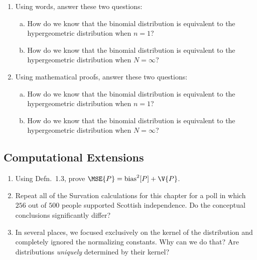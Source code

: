 \begin{enumerate}
  \item Using words, answer these two questions: 
  \begin{enumerate}[a) ]
   \item How do we know that the binomial distribution is equivalent to the hypergeometric distribution when $n=1$? 
   \item How do we know that the binomial distribution is equivalent to the hypergeometric distribution when $N=\infty$?
  \end{enumerate}
  
  \item Using mathematical proofs, answer these two questions: 
  \begin{enumerate}[a) ]
   \item How do we know that the binomial distribution is equivalent to the hypergeometric distribution when $n=1$? 
   \item How do we know that the binomial distribution is equivalent to the hypergeometric distribution when $N=\infty$?
  \end{enumerate}
  

\end{enumerate}








\subsection*{Computational Extensions}
\begin{enumerate}
  \item Using Defn.~1.3, prove $\MSE{P} = \text{bias}^2[P] + \V{P}$.
  \item Repeat all of the Survation calculations for this chapter for a poll in which $256$ out of $500$ people supported Scottish independence. Do the conceptual conclusions significantly differ?
  \item In several places, we focused exclusively on the kernel of the distribution and completely ignored the normalizing constants. Why can we do that? Are distributions \emph{uniquely} determined by their kernel?
\end{enumerate}













